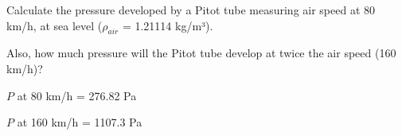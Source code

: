 

Calculate the pressure developed by a Pitot tube measuring air speed at 80 km/h, at sea level ($\rho_{air}$ = 1.21114 kg/m³).

\vskip 10pt

Also, how much pressure will the Pitot tube develop at twice the air speed (160 km/h)?







$P$ at 80 km/h = 276.82 Pa

\vskip 10pt

$P$ at 160 km/h = 1107.3 Pa











